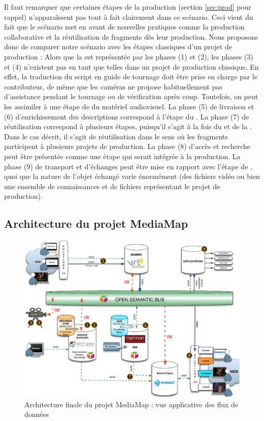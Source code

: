 Il faut remarquer que certaines étapes de la production (section \ref{sec:prod} pour rappel) n'apparaîssent pas tout à fait clairement dans ce scénario.
Ceci vient du fait que le scénario met en avant de nouvelles pratiques comme la production collaborative et la réutilisation de fragments dès leur production. 
Nous proposons donc de comparer notre scénario avec les étapes classiques d'un projet de production : 
Alors que la  est représentée par les phases (1) et (2), les phases (3) et (4) n'existent pas en tant que telles dans un projet de production classique.
En effet, la traduction du script en guide de tournage doit être prise en charge par le contributeur, de même que les caméras ne propose habituellement pas d'assistance pendant le tournage ou de vérification après coup. 
Toutefois, on peut les assimiler à une étape de  du matériel audiovisuel.
La phase (5) de livraison et (6) d'enrichissement des descriptions correspond à l'étape du . 
La phase (7) de réutilisation correspond à plusieurs étapes, puisqu'il s'agit à la fois du  et de la . Dans le cas décrit, il s'agit de réutilisation dans le sens où les fragments participent à plusieurs projets de production. 
La phase (8) d'accès et recherche peut être présentée comme une étape  qui serait intégrée à la production. 
La phase (9) de transport et d'échanges peut être mise en rapport avec l'étape de , quoi que la nature de l'objet échangé varie énormément (des fichiers vidéo ou bien une ensemble de connaissances et de fichiers représentant le projet de production).

\subsection{Architecture du projet MediaMap}\label{sec:arch-compo}

\begin{figure}[ht!]
\centering
\includegraphics[width=1\textwidth]{./images/Architecture-apps-v1.png}
\caption{Architecture finale du projet MediaMap : vue applicative des flux de données}
\label{img:arch-apps}
\end{figure}


